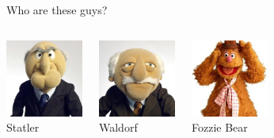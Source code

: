 \documentclass{beamer}\usepackage[]{graphicx}\usepackage[]{color}
\begin{document}
\begin{darkframes}
\begin{frame}{Who are these guys?}
\begin{columns}[onlytextwidth]
\begin{center}
        \includegraphics[width=1in]{statler} \\
        Statler
      \end{center}
      \begin{center}
        \includegraphics[width=1in]{waldorf} \\
        Waldorf
      \end{center}
      \begin{center}
        \includegraphics[width=1in]{fozziebear} \\
        Fozzie Bear
      \end{center}
  \end{columns}
\end{frame}


\end{darkframes}
\end{document}
